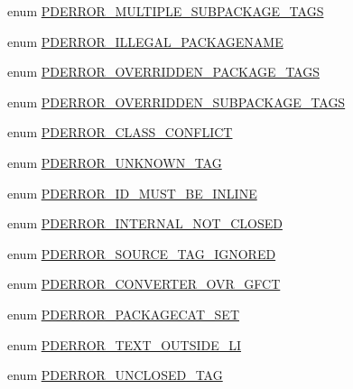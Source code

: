 \begin{DoxyCompactItemize}
\item 
enum \hyperlink{_errors_8inc_aec6bb38e506761e80356d3e50f42b5d2}{\-P\-D\-E\-R\-R\-O\-R\-\_\-\-M\-U\-L\-T\-I\-P\-L\-E\-\_\-\-S\-U\-B\-P\-A\-C\-K\-A\-G\-E\-\_\-\-T\-A\-G\-S} 
\item 
enum \hyperlink{_errors_8inc_a360320b80ae226d0fc9811ff4d2ff872}{\-P\-D\-E\-R\-R\-O\-R\-\_\-\-I\-L\-L\-E\-G\-A\-L\-\_\-\-P\-A\-C\-K\-A\-G\-E\-N\-A\-M\-E} 
\item 
enum \hyperlink{_errors_8inc_adba64697a30fe4d5af73d6ad81a726ac}{\-P\-D\-E\-R\-R\-O\-R\-\_\-\-O\-V\-E\-R\-R\-I\-D\-D\-E\-N\-\_\-\-P\-A\-C\-K\-A\-G\-E\-\_\-\-T\-A\-G\-S} 
\item 
enum \hyperlink{_errors_8inc_a0a78e15f99dd8ae70202cb70c65e3c26}{\-P\-D\-E\-R\-R\-O\-R\-\_\-\-O\-V\-E\-R\-R\-I\-D\-D\-E\-N\-\_\-\-S\-U\-B\-P\-A\-C\-K\-A\-G\-E\-\_\-\-T\-A\-G\-S} 
\item 
enum \hyperlink{_errors_8inc_a23d415c8cbd10e4cad2c4305a553ca07}{\-P\-D\-E\-R\-R\-O\-R\-\_\-\-C\-L\-A\-S\-S\-\_\-\-C\-O\-N\-F\-L\-I\-C\-T} 
\item 
enum \hyperlink{_errors_8inc_ab06a40802e99f189d391eb08c7f95f4d}{\-P\-D\-E\-R\-R\-O\-R\-\_\-\-U\-N\-K\-N\-O\-W\-N\-\_\-\-T\-A\-G} 
\item 
enum \hyperlink{_errors_8inc_a5ea0911ec161b202a2b5725474e23234}{\-P\-D\-E\-R\-R\-O\-R\-\_\-\-I\-D\-\_\-\-M\-U\-S\-T\-\_\-\-B\-E\-\_\-\-I\-N\-L\-I\-N\-E} 
\item 
enum \hyperlink{_errors_8inc_a5fd8de65dbd28142e49ca73f9f8f9137}{\-P\-D\-E\-R\-R\-O\-R\-\_\-\-I\-N\-T\-E\-R\-N\-A\-L\-\_\-\-N\-O\-T\-\_\-\-C\-L\-O\-S\-E\-D} 
\item 
enum \hyperlink{_errors_8inc_ae1279963344d1bd3b644f334f77c669c}{\-P\-D\-E\-R\-R\-O\-R\-\_\-\-S\-O\-U\-R\-C\-E\-\_\-\-T\-A\-G\-\_\-\-I\-G\-N\-O\-R\-E\-D} 
\item 
enum \hyperlink{_errors_8inc_a6fb6f910175d746f562c393fcb25d8a7}{\-P\-D\-E\-R\-R\-O\-R\-\_\-\-C\-O\-N\-V\-E\-R\-T\-E\-R\-\_\-\-O\-V\-R\-\_\-\-G\-F\-C\-T} 
\item 
enum \hyperlink{_errors_8inc_a8e12840b55f3011c480a1e46629f0fcf}{\-P\-D\-E\-R\-R\-O\-R\-\_\-\-P\-A\-C\-K\-A\-G\-E\-C\-A\-T\-\_\-\-S\-E\-T} 
\item 
enum \hyperlink{_errors_8inc_ab94621f0c43c5ba5aa95ed39d7ca5c16}{\-P\-D\-E\-R\-R\-O\-R\-\_\-\-T\-E\-X\-T\-\_\-\-O\-U\-T\-S\-I\-D\-E\-\_\-\-L\-I} 
\item 
enum \hyperlink{_errors_8inc_a390231d72ce09dcfc2865f5243d5a742}{\-P\-D\-E\-R\-R\-O\-R\-\_\-\-U\-N\-C\-L\-O\-S\-E\-D\-\_\-\-T\-A\-G} 
\item 

\end{DoxyCompactItemize}
